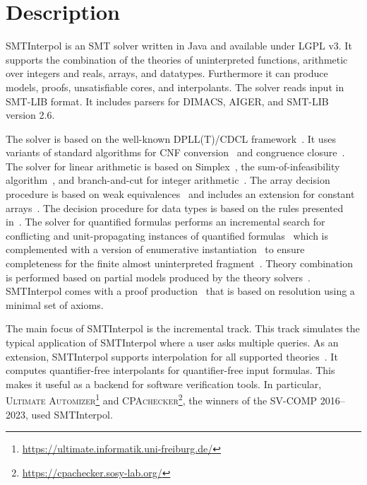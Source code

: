 \documentclass[a4paper]{easychair}
\title{\SI\\{\large Version \version}}
\author{Max Barth\inst{1} \and Jochen Hoenicke\inst{2} \and Tanja Schindler\inst{3}}
\institute{
  LMU Munich, \email{max.barth@lmu.de} \and
  Certora, \email{jochen@certora.com} \and
  University of Basel, \email{tanja.schindler@unibas.ch}
}
\newcommand\SI{SMTInterpol\xspace}
\begin{document}
\maketitle
\section*{Description}
\SI is an SMT solver written in Java and available under LGPL v3.
It supports the combination of the theories of uninterpreted functions, arithmetic over integers and reals, arrays, and datatypes.
Furthermore it can produce models, proofs, unsatisfiable cores, and interpolants.
The solver reads input in SMT-LIB format.
It includes parsers for DIMACS, AIGER, and SMT-LIB version 2.6.

The solver is based on the well-known DPLL(T)/CDCL framework~\cite{DBLP:conf/cav/GanzingerHNOT04}.
It uses variants of standard algorithms for CNF conversion~\cite{DBLP:journals/jsc/PlaistedG86} and congruence closure~\cite{DBLP:conf/rta/NieuwenhuisO05}.
The solver for linear arithmetic is based on Simplex~\cite{DBLP:conf/cav/DutertreM06}, the sum-of-infeasibility algorithm~\cite{DBLP:conf/fmcad/KingBD13}, and branch-and-cut for integer arithmetic~\cite{DBLP:conf/cav/ChristH15,DBLP:conf/cav/DilligDA09}.
The array decision procedure is based on weak equivalences~\cite{DBLP:conf/frocos/ChristH15} and includes an extension for constant arrays~\cite{DBLP:conf/vmcai/HoenickeS19}.
The decision procedure for data types is based on the rules presented in~\cite{DBLP:journals/jsat/BarrettST07}.
The solver for quantified formulas performs an incremental search for conflicting and unit-propagating instances of quantified formulas~\cite{DBLP:conf/vmcai/HoenickeS21} which is complemented with a version of enumerative instantiation~\cite{DBLP:conf/tacas/ReynoldsBF18} to ensure completeness for the finite almost uninterpreted fragment~\cite{DBLP:conf/cav/GeM09}.
Theory combination is performed based on partial models produced by the theory solvers~\cite{DBLP:journals/entcs/MouraB08}.
\SI comes with a proof production~\cite{DBLP:conf/smt/HoenickeS22} that is based on resolution using a minimal set of axioms.

The main focus of \SI is the incremental track.
This track simulates the typical application of \SI where a user asks multiple queries.
As an extension, \SI supports interpolation for all supported theories~\cite{DBLP:journals/jar/ChristH16,DBLP:conf/cade/HoenickeS18,DBLP:conf/vmcai/HoenickeS19,DBLP:conf/smt/HenkelHS21}.  It computes quantifier-free interpolants for quantifier-free input formulas.
This makes it useful as a backend for software verification tools.
In particular, \textsc{Ultimate Automizer}\footnote{\url{https://ultimate.informatik.uni-freiburg.de/}} and \textsc{CPAchecker}\footnote{\url{https://cpachecker.sosy-lab.org/}}, the winners of the SV-COMP 2016--2023, used \SI.
\end{document}
